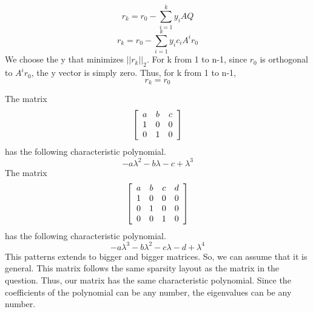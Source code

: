 \documentclass[letterpaper,12pt]{article}
\newenvironment{mat}{\left[ \begin{array}{ccccccccccccc}}{\end{array}\right]}
\newcommand\bcm{\begin{mat}}
\newcommand\ecm{\end{mat}}
\begin{document}
\begin{enumerate}
\begin{enumerate}
\[r_k = r_0 - \sum_{i=1}^{k} y_i  AQ\]
\[r_k = r_0 - \sum_{i=1}^{k} y_i c_i A^ir_0\]
We choose the y that minimizes $||r_k||_2$. For k from 1 to n-1, since $r_0$ is orthogonal to $A^ir_0$, the y vector is simply zero.
Thus, for k from 1 to n-1,
\[r_k = r_0\]

The matrix
\[ \bcm a &b &c \\ 1 &0 &0\\0 &1 &0\ecm\]
 has the following characteristic polynomial.
\[-a\lambda^2-b\lambda-c+\lambda^3\]
The matrix
\[ \bcm a &b &c &d\\ 1 &0 &0&0\\0 &1 &0&0\\0 &0 &1&0\\\ecm\]
 has the following characteristic polynomial.
 \[-a\lambda^3-b\lambda^2-c\lambda-d+\lambda^4\]
This patterns extends to bigger and bigger matrices. So, we can assume that it is general. This matrix follows the same sparsity layout as the matrix in the question. Thus, our matrix has the same characteristic polynomial. Since the coefficients of the polynomial can be any number, the eigenvalues can be any number.

\end{enumerate}
\end{enumerate}
\end{document}
